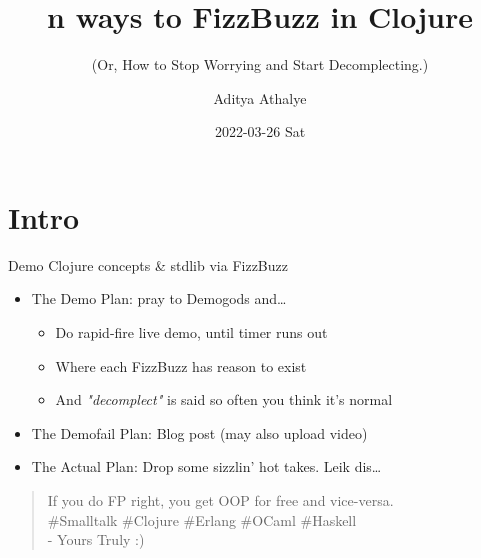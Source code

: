 \documentclass[presentation]{beamer}
\author{Aditya Athalye}
\date{2022-03-26 Sat}
\title{n ways to FizzBuzz in Clojure}
\subtitle{(Or, How to Stop Worrying and Start Decomplecting.)}
\begin{document}
\maketitle
\section{Intro}
\label{sec:org62bc719}
\begin{frame}[label={sec:org6be44f6}]{Demo Clojure concepts \& stdlib via FizzBuzz}
\begin{itemize}
\item \alert{The Demo Plan}: pray to Demogods and\ldots{}
\begin{itemize}
\item Do rapid-fire live demo, until timer runs out
\item Where each FizzBuzz has reason to exist
\item And \emph{"decomplect"} is said so often you think it's normal
\end{itemize}
\end{itemize}
\pause
\begin{itemize}
\item \alert{The Demofail Plan}: Blog post (may also upload video)
\end{itemize}
\pause
\begin{itemize}
\item \alert{The Actual Plan}: Drop some sizzlin' hot takes. Leik dis\ldots{}
\end{itemize}

\begin{verse}
If you do FP right, you get OOP for free and vice-versa.\\
\#Smalltalk \#Clojure \#Erlang \#OCaml \#Haskell\\
- Yours Truly :)\\
\end{verse}
\end{frame}
\end{document}

